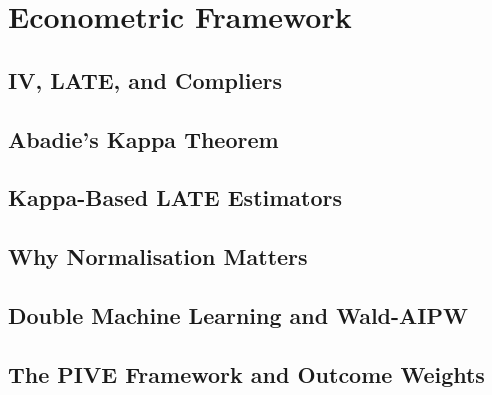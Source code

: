 \documentclass[12pt, a4paper, oneside]{article}
\theoremstyle{plain}
\theoremstyle{definition}
\begin{document}
\section{Econometric Framework}
\label{sec:framework}

\subsection{IV, LATE, and Compliers}
\label{subsec:late}


\subsection{Abadie's Kappa Theorem}
\label{subsec:kappa_theorem}


\subsection{Kappa-Based LATE Estimators}
\label{subsec:estimators}


\subsection{Why Normalisation Matters}
\label{subsec:normalisation}


\subsection{Double Machine Learning and Wald-AIPW}
\label{subsec:dml}


\subsection{The PIVE Framework and Outcome Weights}
\label{subsec:pive}

\end{document}
